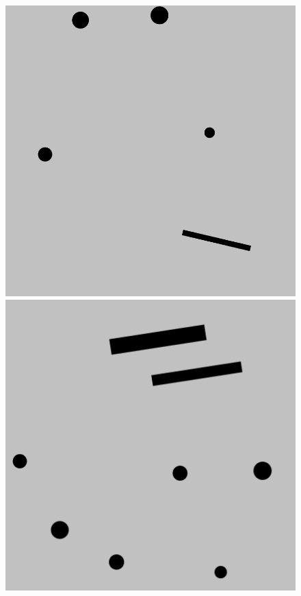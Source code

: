 \documentclass{beamer}
\begin{document}
\begin{frame}
\begin{figure}[H]
\begin{columns}
						\begin{column}{0.14\textwidth}
							\includegraphics[width=1\linewidth]{graphics/test_model_05_3.png}
							\includegraphics[width=1\linewidth]{graphics/test_model_08_3.png}

\end{column}
\end{columns}
\end{figure}
\end{frame}
\end{document}
